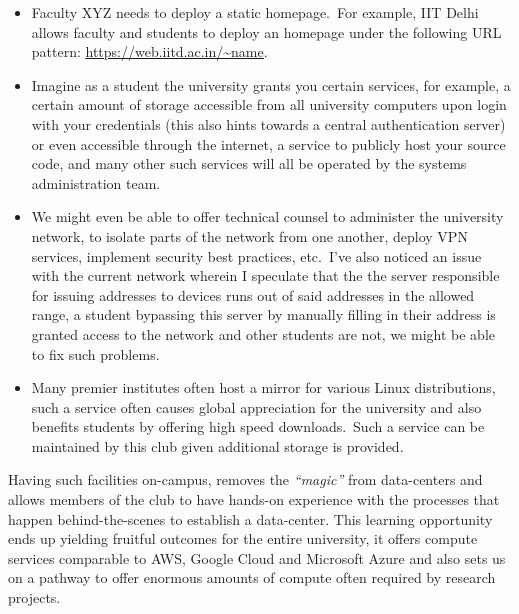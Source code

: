 \documentclass[11pt,twocolumn,oneside]{book}
\begin{document}
    \begin{itemize}
        \item Faculty XYZ needs to deploy a static homepage.\ For example, IIT Delhi allows faculty and students to
        deploy an homepage under the following URL pattern:
        \href{https://web.iitd.ac.in/~name}{\color{blue}\underline{\url{https://web.iitd.ac.in/~name}}}.
        \item Imagine as a student the university grants you certain services, for example, a certain amount of storage
        accessible from all university computers upon login with your credentials (this also hints towards a central
        authentication server) or even accessible through the internet, a service to publicly host your source code,
        and many other such services will all be operated by the systems administration team.
        \item We might even be able to offer technical counsel to administer the university network, to isolate parts of
        the network from one another, deploy VPN services, implement security best practices, etc.\ I've also noticed an
        issue with the current network wherein I speculate that the the server responsible for issuing addresses to
        devices runs out of said addresses in the allowed range, a student bypassing this server by manually filling in
        their address is granted access to the network and other students are not, we might be able to fix such
        problems.
        \item Many premier institutes often host a mirror for various Linux distributions, such a service often causes
        global appreciation for the university and also benefits students by offering high speed downloads.\ Such a
        service can be maintained by this club given additional storage is provided.
    \end{itemize}

    Having such facilities on-campus, removes the \emph{``magic''} from data-centers and allows members of the
    club to have hands-on experience with the processes that happen behind-the-scenes to establish a data-center.
    This learning opportunity ends up yielding fruitful outcomes for the entire university, it offers compute
    services comparable to AWS, Google Cloud and Microsoft Azure and also sets us on a pathway to offer enormous
    amounts of compute often required by research projects.

\end{document}
